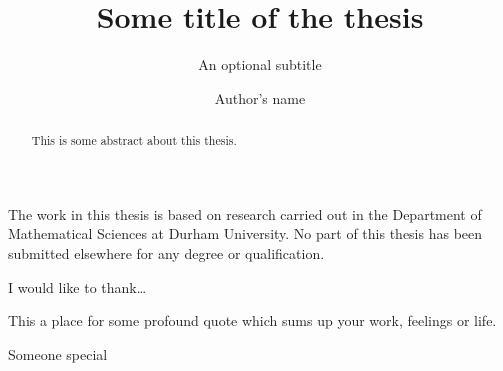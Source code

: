 \documentclass[twoside,openright,frontopenright]{dmathesis}
\begin{document}
\title{Some title of the thesis}
\subtitle{An optional subtitle}
\author{Author's name}
\maketitlepage*

\begin{abstract}
%
	This is some abstract about this thesis.
%
\end{abstract}

\begin{declaration*}
%
	The work in this thesis is based on research carried out in the Department of
	Mathematical Sciences at Durham University. No part of this thesis has been
	submitted elsewhere for any degree or qualification.
%
\end{declaration*}

\begin{acknowledgements*}
%
	I would like to thank\ldots
%
\end{acknowledgements*}

\begin{epigraph*}
%
	This a place for some profound quote which sums up your work, feelings or
	life.
%
\end{epigraph*}

\begin{dedication*}
%
	Someone special
%
\end{dedication*}

\disableprotrusion
\tableofcontents*
\listoffigures
\listoftables
\enableprotrusion

\cleardoublepage
{}

%
%
%
%
%

\appendix
%
%

\nocite{*}
\printbibliography[heading=bibintoc]
\end{document}

